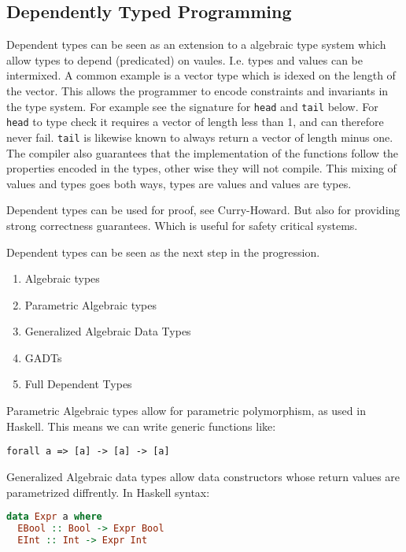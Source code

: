 \documentclass[parskip=half]{scrartcl}
\begin{document}
\subsection{Dependently Typed Programming}

Dependent types can be seen as an extension to a algebraic type system which
allow types to depend (predicated) on vaules. I.e. types and values can be
intermixed. A common example is a vector type which is idexed on the length of
the vector. This allows the programmer to encode constraints and invariants in
the type system. For example see the signature for \texttt{head} and
\texttt{tail} below.  For \texttt{head} to type check it requires a vector of
length less than 1, and can therefore never fail. \texttt{tail} is likewise
known to always return a vector of length minus one. The compiler also
guarantees that the implementation of the functions follow the properties
encoded in the types, other wise they will not compile.  This mixing of values
and types goes both ways, types are values and values are types.

Dependent types can be used for proof, see Curry-Howard. But also for providing
strong correctness guarantees. Which is useful for safety critical systems.

Dependent types can be seen as the next step in the progression.
\begin{enumerate}
  \item Algebraic types
  \item Parametric Algebraic types
  \item Generalized Algebraic Data Types
  \item GADTs
  \item Full Dependent Types
\end{enumerate}

Parametric Algebraic types allow for parametric polymorphism, as used in
Haskell. This means we can write generic functions like:
\begin{lstlisting}[language=Lambda]
    forall a => [a] -> [a] -> [a]
\end{lstlisting}

Generalized Algebraic data types allow data constructors whose return values
are parametrized diffrently. In Haskell syntax:

\begin{lstlisting}[language=Haskell]
data Expr a where
  EBool :: Bool -> Expr Bool
  EInt :: Int -> Expr Int
\end{lstlisting}
\end{document}
